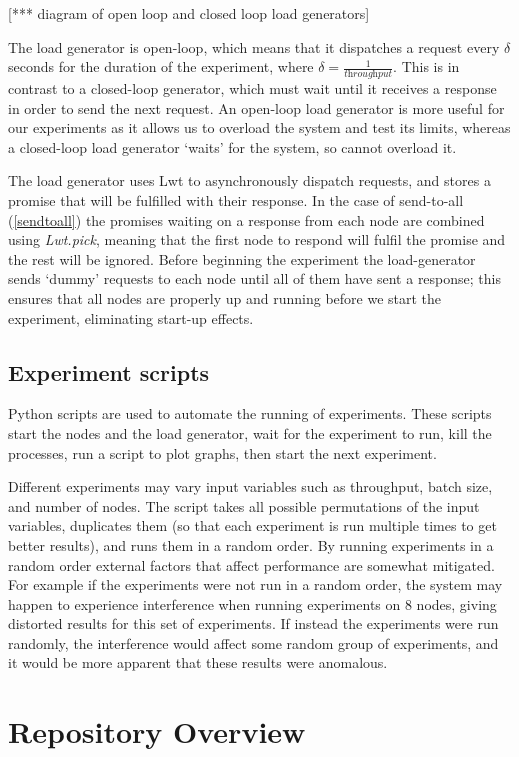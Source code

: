 [*** diagram of open loop and closed loop load generators]

The load generator is open-loop, which means that it dispatches a request every $\delta$ seconds for the duration of the experiment, where $\delta = \frac{1}{\textit{throughput}}$. This is in contrast to a closed-loop generator, which must wait until it receives a response in order to send the next request. An open-loop load generator is more useful for our experiments as it allows us to overload the system and test its limits, whereas a closed-loop load generator `waits' for the system, so cannot overload it.

The load generator uses Lwt to asynchronously dispatch requests, and stores a promise that will be fulfilled with their response. In the case of send-to-all (\ref{sendtoall}) the promises waiting on a response from each node are combined using \textit{Lwt.pick}, meaning that the first node to respond will fulfil the promise and the rest will be ignored. Before beginning the experiment the load-generator sends `dummy' requests to each node until all of them have sent a response; this ensures that all nodes are properly up and running before we start the experiment, eliminating start-up effects.

\subsection{Experiment scripts}
Python scripts are used to automate the running of experiments. These scripts start the nodes and the load generator, wait for the experiment to run, kill the processes, run a script to plot graphs, then start the next experiment.

Different experiments may vary input variables such as throughput, batch size, and number of nodes. The script takes all possible permutations of the input variables, duplicates them (so that each experiment is run multiple times to get better results), and runs them in a random order. By running experiments in a random order external factors that affect performance are somewhat mitigated. For example if the experiments were not run in a random order, the system may happen to experience interference when running experiments on 8 nodes, giving distorted results for this set of experiments. If instead the experiments were run randomly, the interference would affect some random group of experiments, and it would be more apparent that these results were anomalous.

\section{Repository Overview} \label{repo}

